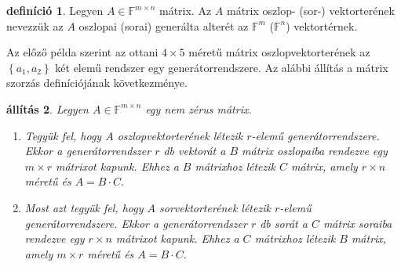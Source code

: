 \documentclass[9pt, showtrims]{memoir}
\theoremstyle{plain}
\newtheorem{proposition}{állítás}[section]
\theoremstyle{remark}
\theoremstyle{definition}
\newtheorem{definition}[proposition]{definíció}
\renewcommand{\mathbf}{\mathbb}
\begin{document}
\begin{definition}
    Legyen $A\in\mathbf{F}^{m\times n}$ mátrix.
    Az $A$ mátrix oszlop- (sor-) vektorterének nevezzük az $A$ oszlopai (sorai) generálta alterét az $\mathbf{F}^m$ ($\mathbf{F}^n$)
    vektortérnek.
\end{definition}
Az előző példa szerint az ottani $4\times 5$ méretű mátrix oszlopvektorterének az $\left\{ a_1,a_2 \right\}$ két elemű rendszer
egy generátorrendszere.
Az alábbi állítás a mátrix szorzás definíciójának következménye.
\begin{proposition}
    Legyen $A\in\mathbf{F}^{m\times n}$ egy nem zérus mátrix.
    \begin{enumerate}
        \item 
            Tegyük fel, hogy $A$ oszlopvektorterének létezik $r$-elemű generátorrendszere.
            Ekkor a generátorrendszer $r$ db vektorát a $B$ mátrix oszlopaiba rendezve egy $m\times r$ mátrixot kapunk.
            Ehhez a $B$ mátrixhoz létezik $C$ mátrix, amely $r\times n$ méretű és 
            \(
            A=B\cdot C.
            \)
        \item
            Most azt tegyük fel, hogy $A$ sorvektorterének létezik $r$-elemű generátorrendszere.
            Ekkor a generátorrendszer $r$ db sorát a $C$ mátrix soraiba rendezve egy $r\times n$ mátrixot kapunk.
            Ehhez a $C$ mátrixhoz létezik $B$ mátrix, amely $m\times r$ méretű és 
            \(
            A=B\cdot C.
            \)\qedhere
    \end{enumerate}
\end{proposition}
\end{document}
